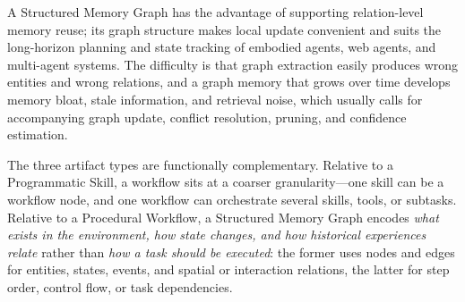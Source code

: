 A Structured Memory Graph has the advantage of supporting relation-level memory reuse; its graph structure makes local update convenient and suits the long-horizon planning and state tracking of embodied agents, web agents, and multi-agent systems. The difficulty is that graph extraction easily produces wrong entities and wrong relations, and a graph memory that grows over time develops memory bloat, stale information, and retrieval noise, which usually calls for accompanying graph update, conflict resolution, pruning, and confidence estimation.

The three artifact types are functionally complementary. Relative to a Programmatic Skill, a workflow sits at a coarser granularity---one skill can be a workflow node, and one workflow can orchestrate several skills, tools, or subtasks. Relative to a Procedural Workflow, a Structured Memory Graph encodes \emph{what exists in the environment, how state changes, and how historical experiences relate} rather than \emph{how a task should be executed}: the former uses nodes and edges for entities, states, events, and spatial or interaction relations, the latter for step order, control flow, or task dependencies.
